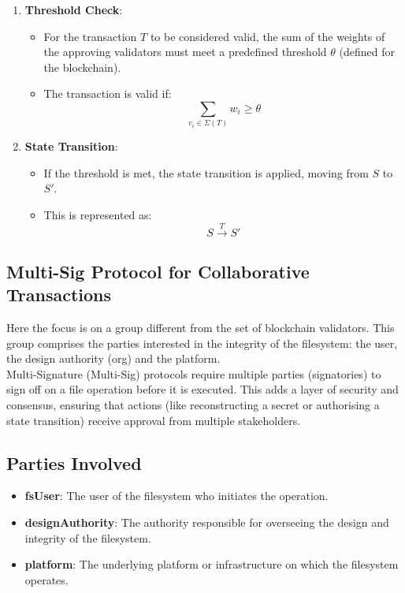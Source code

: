 \documentclass{tufte-handout}
\begin{document}
\begin{enumerate}
    \item \textbf{Threshold Check}:
    \begin{itemize}
        \item For the transaction \( T \) to be considered valid, the sum of the weights of the approving validators must meet a predefined threshold \( \theta \)
        (defined for the blockchain).
        \item The transaction is valid if:
        \[
        \sum_{v_i \in \Sigma(T)} w_i \geq \theta
        \]
    \end{itemize}
    \item \textbf{State Transition}:
    \begin{itemize}
        \item If the threshold is met, the state transition is applied, moving from \( S \) to \( S' \).
        \item This is represented as:
        \[
        S \xrightarrow{T} S'
        \]
    \end{itemize}
\end{enumerate}


\subsection{Multi-Sig Protocol for Collaborative Transactions}
Here the focus is on a group different from the set of blockchain validators. This group comprises the parties interested in the integrity
of the filesystem: the user, the design authority (org) and the platform.\\
\vspace{10pt}
Multi-Signature (Multi-Sig) protocols require multiple parties (signatories) to sign off on a file operation before it is executed.
This adds a layer of security and consensus, ensuring that actions (like reconstructing a secret or authorising a state transition) receive
approval from multiple stakeholders.

\subsection*{Parties Involved}
\begin{itemize}
    \item \textbf{fsUser}: The user of the filesystem who initiates the operation.
    \item \textbf{designAuthority}: The authority responsible for overseeing the design and integrity of the filesystem.
    \item \textbf{platform}: The underlying platform or infrastructure on which the filesystem operates.
\end{itemize}
\end{document}
